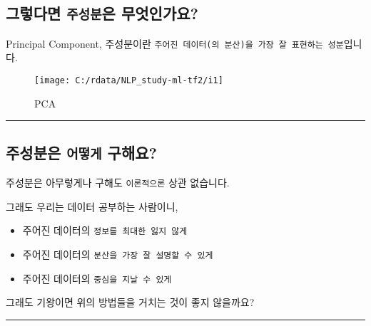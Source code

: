 \documentclass[
]{article}
\providecommand{\tightlist}{%
  \setlength{\itemsep}{0pt}\setlength{\parskip}{0pt}}
\begin{document}
\hypertarget{uxadf8uxb807uxb2e4uxba74-uxc8fcuxc131uxbd84uxc740-uxbb34uxc5c7uxc778uxac00uxc694}{%
\subsection{\texorpdfstring{그렇다면 \texttt{주성분}은
무엇인가요?}{그렇다면 주성분은 무엇인가요?}}\label{uxadf8uxb807uxb2e4uxba74-uxc8fcuxc131uxbd84uxc740-uxbb34uxc5c7uxc778uxac00uxc694}}

Principal Component, 주성분이란
\texttt{주어진\ 데이터(의\ 분산)을\ 가장\ 잘\ 표현하는\ 성분}입니다.

\begin{figure}

{\centering \texttt{[image: C:/rdata/NLP\_study-ml-tf2/i1]} 

}

\caption{PCA}\label{fig:unnamed-chunk-1}
\end{figure}

\begin{center}\rule{0.5\linewidth}{0.5pt}\end{center}

\hypertarget{uxc8fcuxc131uxbd84uxc740-uxc5b4uxb5bbuxac8c-uxad6cuxd574uxc694}{%
\subsection{\texorpdfstring{주성분은 \texttt{어떻게}
구해요?}{주성분은 어떻게 구해요?}}\label{uxc8fcuxc131uxbd84uxc740-uxc5b4uxb5bbuxac8c-uxad6cuxd574uxc694}}

주성분은 아무렇게나 구해도 \texttt{이론적으론} 상관 없습니다.

그래도 우리는 데이터 공부하는 사람이니,

\begin{itemize}
\tightlist
\item
  주어진 데이터의 \texttt{정보를\ 최대한\ 잃지\ 않게}
\item
  주어진 데이터의 \texttt{분산을\ 가장\ 잘\ 설명할\ 수\ 있게}\\
\item
  주어진 데이터의 \texttt{중심을\ 지날\ 수\ 있게}
\end{itemize}

그래도 기왕이면 위의 방법들을 거치는 것이 좋지 않을까요?

\begin{center}\rule{0.5\linewidth}{0.5pt}\end{center}
\end{document}
